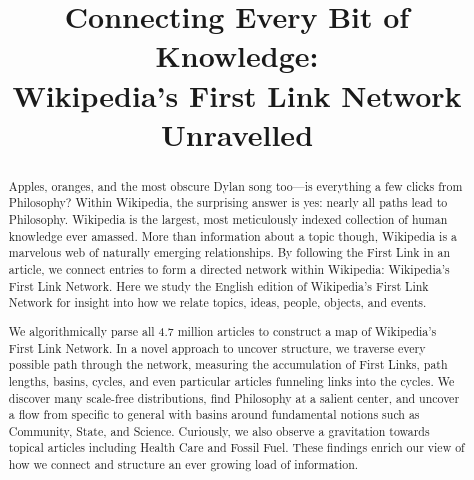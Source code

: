 \documentclass[pre,twocolumn,twoside,superscriptaddress,floatfix, aps, 10pt]{revtex4-1}
\begin{document}
\title{\protect
Connecting Every Bit of Knowledge: \\
Wikipedia's First Link Network Unravelled
}

\author{
}


\author{
}



\author{
}



\begin{abstract}
  \protect
Apples, oranges, and the most obscure Dylan song too---is everything a few clicks from Philosophy? 
Within Wikipedia, the surprising answer is yes: nearly all 
paths lead to Philosophy.
Wikipedia is the largest, most meticulously indexed collection of human knowledge ever amassed. 
More than information about a topic though, Wikipedia is a marvelous web of naturally emerging relationships.  
By following the First Link in an article, we connect entries to form a directed network within Wikipedia: Wikipedia's First Link Network. 
Here we study the English edition of Wikipedia's First Link Network for insight into how we relate topics, ideas, people, objects, and events.  


We algorithmically parse all 4.7 million articles to construct a map of Wikipedia's First Link Network. 
In a novel approach to uncover structure, we traverse every possible path through the network, 
measuring the accumulation of First Links, path lengths, basins, cycles, and even particular articles funneling links into the cycles.
We discover many scale-free distributions, find Philosophy at a salient center, and uncover a flow from specific to general with 
basins around fundamental notions such as Community, State, and Science. 
Curiously, we also observe a gravitation towards topical articles including Health Care and Fossil Fuel.
These findings enrich our view of how we connect and structure
an ever growing load of information.
 
\end{abstract}
\end{document}
